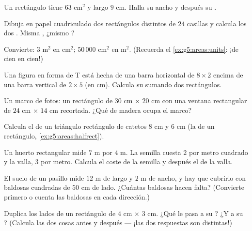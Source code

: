 \begin{exercise}[$\star$]\label{exo:g5:areas:3}
Un rectángulo tiene  $63$ cm$^2$ y largo $9$ cm. Halla su ancho
y después su .
\end{exercise}

\begin{exercise}[$\star$]\label{exo:g5:areas:4}
Dibuja en papel cuadriculado dos rectángulos distintos de  $24$ casillas
y calcula los dos . Misma , ¿mismo ?
\end{exercise}

\begin{exercise}[$\star$]\label{exo:g5:areas:5}
Convierte: $3$ m$^2$ en cm$^2$; \quad $50\,000$ cm$^2$ en m$^2$.
(Recuerda el \cref{ex:g5:areas:units}: ¡de cien en cien!)
\end{exercise}

\begin{exercise}[$\star$]\label{exo:g5:areas:6}
Una figura en forma de T está hecha de una barra horizontal de $8 \times 2$ encima de
una barra vertical de $2 \times 5$ (en cm). Calcula su  sumando dos
rectángulos.
\end{exercise}

\begin{exercise}[$\star$]\label{exo:g5:areas:7}
Un marco de fotos: un rectángulo de $30$ cm $\times$ $20$ cm con una
ventana rectangular de $24$ cm $\times$ $14$ cm recortada. ¿Qué  de
madera ocupa el marco?
\end{exercise}

\begin{exercise}[$\star$]\label{exo:g5:areas:8}
Calcula el  de un triángulo rectángulo de catetos $8$ cm y $6$ cm
(la  de un rectángulo, \cref{ex:g5:areas:halfrect}).
\end{exercise}

\begin{exercise}[$\star$]\label{exo:g5:areas:9}
Un huerto rectangular mide $7$ m por $4$ m. La semilla cuesta
$2$ por metro cuadrado y la valla, $3$ por metro. Calcula el coste de
la semilla y después el de la valla.
\end{exercise}

\begin{exercise}[$\star\star$]\label{exo:g5:areas:10}
El suelo de un pasillo mide $12$ m de largo y $2$ m de ancho, y hay que cubrirlo
con baldosas cuadradas de $50$ cm de lado. ¿Cuántas baldosas hacen falta?
(Convierte primero o cuenta las baldosas en cada dirección.)
\end{exercise}

\begin{exercise}[$\star\star$]\label{exo:g5:areas:11}
Duplica los lados de un rectángulo de $4$ cm $\times$ $3$ cm. ¿Qué le pasa
a su ? ¿Y a su ? (Calcula las dos cosas antes y después ---
¡las dos respuestas son distintas!)
\end{exercise}

